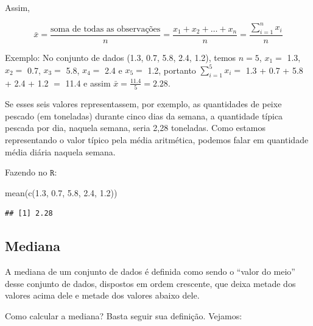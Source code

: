 \documentclass[
]{book}
\newenvironment{Shaded}{\begin{snugshade}}{\end{snugshade}}
\newcommand{\FloatTok}[1]{\textcolor[rgb]{0.00,0.00,0.81}{#1}}
\newcommand{\FunctionTok}[1]{\textcolor[rgb]{0.00,0.00,0.00}{#1}}
\newcommand{\NormalTok}[1]{#1}
\begin{document}
Assim,

\begin{equation*}
\bar x = \frac{\text{soma de todas as observações}}{{n}} = \frac{x_1 + x_2 + \ldots + x_n}{n}= \frac{\sum_{i=1}^n x_i} {n}
\end{equation*}

Exemplo: No conjunto de dados (1.3, 0.7, 5.8, 2.4, 1.2), temos \(n=5\), \(x_1=\) 1.3, \(x_2=\) 0.7, \(x_3=\) 5.8, \(x_4=\) 2.4 e \(x_5=\) 1.2, portanto \(\sum_{i=1}^5 x_i=\) 1.3 + 0.7 + 5.8 + 2.4 + 1.2 \(=\) 11.4 e assim \(\bar x = \frac{11.4}{5}=2.28\).

Se esses seis valores representassem, por exemplo, as quantidades de peixe pescado (em toneladas) durante cinco dias da semana, a quantidade típica pescada por dia, naquela semana, seria 2,28 toneladas. Como estamos representando o valor típico pela média aritmética, podemos falar em quantidade média diária naquela semana.

Fazendo no \(\texttt{R}\):

\begin{Shaded}
\begin{Highlighting}[]
\FunctionTok{mean}\NormalTok{(}\FunctionTok{c}\NormalTok{(}\FloatTok{1.3}\NormalTok{, }\FloatTok{0.7}\NormalTok{, }\FloatTok{5.8}\NormalTok{, }\FloatTok{2.4}\NormalTok{, }\FloatTok{1.2}\NormalTok{))}
\end{Highlighting}
\end{Shaded}

\begin{verbatim}
## [1] 2.28
\end{verbatim}

\hypertarget{mediana}{%
\subsection{Mediana}\label{mediana}}

A mediana de um conjunto de dados é definida como sendo o ``valor do meio'' desse conjunto de dados, dispostos em ordem crescente, que deixa metade dos valores acima dele e metade dos valores abaixo dele.

Como calcular a mediana? Basta seguir sua definição. Vejamos:
\end{document}
